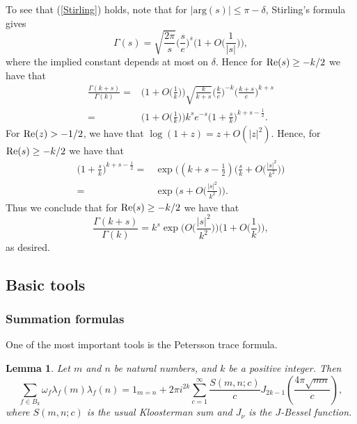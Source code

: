 \documentclass[a4paper,10pt,twoside]{amsart}
\newtheorem{lemma}[theorem]{Lemma}
\theoremstyle{definition}
\numberwithin{equation}{section}
\renewcommand{\Re}{\textnormal{Re}}
\renewcommand\:{\colon}
\begin{document}
To see that (\ref{Stirling}) holds, note that for $|\text{arg}(s)|\le \pi-\delta$, Stirling's formula gives
\[
\Gamma(s)=\sqrt{\frac{2\pi}{s}} \bigg(\frac{s}{e}\bigg)^s \bigg(1+O\bigg(\frac{1}{|s|}\bigg)\bigg),
\]
where the implied constant depends at most on $\delta$. Hence for $\Re(s) \geq -k/2$ we have that
\[
\begin{split}
\frac{\Gamma(k+s)}{\Gamma(k)}=&\bigg(1+O\bigg( \frac{1}{k} \bigg) \bigg) \sqrt{\frac{k}{k+s}} \bigg(\frac{k}{e} \bigg)^{-k} \bigg(\frac{k+s}{e} \bigg)^{k+s}\\
=&\bigg(1+O\bigg(\frac{1}{k} \bigg) \bigg) k^s e^{-s} \bigg(1+\frac{s}{k} \bigg)^{k+s-\frac12}.
\end{split}
\]
For $\Re(z)>-1/2$, we have that $\log (1+z)=z+O(|z|^2)$. Hence, for $\Re(s)\geq-k/2$ we have that
\[
\begin{split}
\bigg(1+\frac{s}{k} \bigg)^{k+s-\frac12}=&\exp\bigg((k+s-\tfrac12)\bigg(\frac{s}{k}+O\bigg( \frac{|s|^2}{k^2} \bigg) \bigg) \\
=& \exp\bigg(s+O\bigg( \frac{|s|^2}{k^2} \bigg) \bigg).
\end{split}
\]
Thus we conclude that for $\Re(s) \geq -k/2$ we have that
\[
\frac{\Gamma(k+s)}{\Gamma(k)}=k^s\exp\bigg( O\bigg( \frac{|s|^2}{k^2}\bigg)\bigg)\bigg(1+O\bigg(  \frac{1}{k} \bigg)\bigg),
\]
as desired.

\subsection{Basic tools}

\subsubsection{Summation formulas}

One of the most important tools is the Petersson trace formula. 

\begin{lemma}\label{Petersson}
Let $m$ and $n$ be natural numbers, and $k$ be a positive integer. Then
\[\sum_{f\in B_k}\omega_f\lambda_f(m)\lambda_f(n)=1_{m=n}+2\pi i^{2k}\sum_{c=1}^\infty\frac{S(m,n;c)}c J_{2k-1}\left(\frac{4\pi\sqrt{mn}}c\right),\]
where $S(m,n;c)$ is the usual Kloosterman sum and $J_\nu$ is the $J$-Bessel function. 
\end{lemma}
\end{document}
